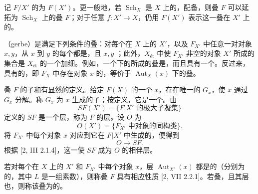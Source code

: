记 $F/X'$ 的为 $F(X')$。更一般地，若 $\operatorname{Sch}_X$ 是 $X$ 上的，配备，则叠 $F$ 可以延拓为 $\operatorname{Sch}_X$ 上的叠 $F$；对于任意 $f:X'\to X$，仍用 $F(X')$ 表示这一叠在 $X'$ 上的。

（gerbe）是满足下列条件的叠：对每个在 $X$ 上的 $X'$，以及 $F_{X'}$ 中任意一对对象 $x,y$，从 $x$ 到 $y$ 的每个都是，且 $x,y$ ；此外，$X_{\text{ét}}$ 中使 $F_{X'}$ 非空的对象 $X'$ 所成的集合是 $X_{\text{ét}}$ 的一个加细。例如，一个下的所成的叠是，而且具有一个。反过来，具有的，即 $F_X$ 中存在对象 $x$ 的，等价于 $\operatorname{Aut}_X(x)$ 下的叠。

叠 $F$ 的子和有显然的定义。给定 $F(X)$ 的一个 $x$，存在唯一的 $G_x$，使 $x$ 通过 $G_x$ 分解。称 $G_x$ 为 $x$ 生成的子；按定义，它是一个。由
\[
SF(X')=\{F|X'\text{ 的极大子凝集}\}
\]
定义的 $SF$ 是一个层，称为 $F$ 的层。设 $O$ 为
\[
O(X')=\{F_{X'}\text{ 中对象的同构类}\}.
\]
将 $F_{X'}$ 中每个对象 $x$ 对应到它在 $F|X'$ 中生成的，便得到
\[O\longrightarrow SF.\]
根据 [2, III 2.1.4]，这一使 $SF$ 成为 $O$ 的相伴层。

若对每个在 $X$ 上的 $X'$ 和 $F_{X'}$ 中每个对象 $x$，层 $\operatorname{Aut}_{X'}(x)$ 都是的（分别为的，其中 $L$ 是一组素数），则称叠 $F$ 具有相应性质 [2, VII 2.2.1]。若叠，且其层也，则称该叠为的。

